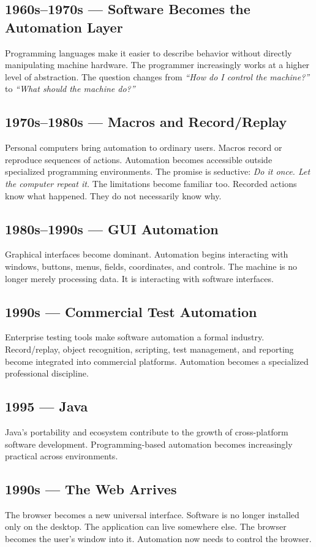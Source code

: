 \documentclass[11pt,twoside]{book}
\begin{document}
\subsection*{1960s–1970s — Software Becomes the Automation Layer}
Programming languages make it easier to describe behavior without directly manipulating machine hardware.
The programmer increasingly works at a higher level of abstraction.
The question changes from \emph{``How do I control the machine?''} to \emph{``What should the machine do?''}

\subsection*{1970s–1980s — Macros and Record/Replay}
Personal computers bring automation to ordinary users.
Macros record or reproduce sequences of actions.
Automation becomes accessible outside specialized programming environments.
The promise is seductive: \emph{Do it once. Let the computer repeat it.}
The limitations become familiar too. Recorded actions know what happened. They do not necessarily know why.

\subsection*{1980s–1990s — GUI Automation}
Graphical interfaces become dominant.
Automation begins interacting with windows, buttons, menus, fields, coordinates, and controls.
The machine is no longer merely processing data. It is interacting with software interfaces.

\subsection*{1990s — Commercial Test Automation}
Enterprise testing tools make software automation a formal industry.
Record/replay, object recognition, scripting, test management, and reporting become integrated into commercial platforms.
Automation becomes a specialized professional discipline.

\subsection*{1995 — Java}
Java's portability and ecosystem contribute to the growth of cross-platform software development.
Programming-based automation becomes increasingly practical across environments.

\subsection*{1990s — The Web Arrives}
The browser becomes a new universal interface.
Software is no longer installed only on the desktop. The application can live somewhere else.
The browser becomes the user's window into it.
Automation now needs to control the browser.
\end{document}
